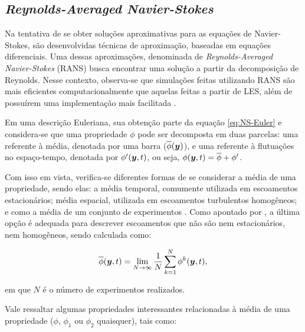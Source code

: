 \subsection{\textit{Reynolds-Averaged Navier-Stokes}} \label{RANS}

Na tentativa de se obter soluções aproximativas para as equações de Navier-Stokes, são desenvolvidas técnicas de aproximação, baseadas em equações diferenciais. Uma dessas aproximações, denominada de \textit{Reynolds-Averaged Navier-Stokes} (RANS) busca encontrar uma solução a partir da decomposição de Reynolds. Nesse contexto, observa-se que simulações feitas utilizando RANS são mais eficientes computacionalmente que aquelas feitas a partir de LES, além de possuírem uma implementação mais facilitada \cite{alfonsi2009reynolds, ling2015evaluation}.

Em uma descrição Euleriana, sua obtenção parte da equação \ref{eq:NS-Euler} e considera-se que uma propriedade $\phi$ pode ser decomposta em duas parcelas: uma referente à média, denotada por uma barra ($\overline{\phi}(\boldsymbol{y})$), e uma referente à flutuações no espaço-tempo, denotada por $\phi'(\boldsymbol{y},t)$, ou seja, $\phi(\boldsymbol{y},t)=\overline{\phi}+\phi'$.

Com isso em vista, verifica-se diferentes formas de se considerar a média de uma propriedade, sendo elas: a média temporal, comumente utilizada em escoamentos estacionários; média espacial, utilizada em escoamentos turbulentos homogêneos; e como a média de um conjunto de experimentos \cite{tennekes1972first,speziale1991analytical,alfonsi2009reynolds}. Como apontado por , a última opção é adequada para descrever escoamentos que não são nem estacionários, nem homogêneos, sendo calculada como:

\begin{equation}
    \overline{\phi}(\boldsymbol{y},t)=\lim_{N\to\infty}{\frac{1}{N}\sum_{k=1}^N{\phi^{k}(\boldsymbol{y},t)}}\text{,}
\end{equation}

\noindent em que $N$ é o número de experimentos realizados.

Vale ressaltar algumas propriedades interessantes relacionadas à média de uma propriedade ($\phi$, $\phi_1$ ou $\phi_2$ quaisquer), tais como:

